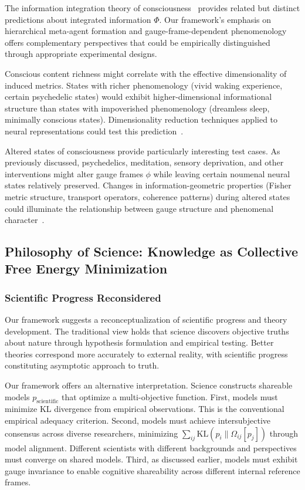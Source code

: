\documentclass[11pt]{article}
\begin{document}
The information integration theory of consciousness~\cite{Tononi2004,Tononi2016} provides related but distinct predictions about integrated information $\Phi$. Our framework's emphasis on hierarchical meta-agent formation and gauge-frame-dependent phenomenology offers complementary perspectives that could be empirically distinguished through appropriate experimental designs.

Conscious content richness might correlate with the effective dimensionality of induced metrics. States with richer phenomenology (vivid waking experience, certain psychedelic states) would exhibit higher-dimensional informational structure than states with impoverished phenomenology (dreamless sleep, minimally conscious states). Dimensionality reduction techniques applied to neural representations could test this prediction~\cite{Gao2017,Shine2019}.

Altered states of consciousness provide particularly interesting test cases. As previously discussed, psychedelics, meditation, sensory deprivation, and other interventions might alter gauge frames $\phi$ while leaving certain noumenal neural states relatively preserved. Changes in information-geometric properties (Fisher metric structure, transport operators, coherence patterns) during altered states could illuminate the relationship between gauge structure and phenomenal character~\cite{Carhart-Harris2014,Milliere2018}.

\subsection{Philosophy of Science: Knowledge as Collective Free Energy Minimization}

\subsubsection{Scientific Progress Reconsidered}

Our framework suggests a reconceptualization of scientific progress and theory development. The traditional view holds that science discovers objective truths about nature through hypothesis formulation and empirical testing. Better theories correspond more accurately to external reality, with scientific progress constituting asymptotic approach to truth.

Our framework offers an alternative interpretation. Science constructs shareable models $p_{\text{scientific}}$ that optimize a multi-objective function. First, models must minimize KL divergence from empirical observations.  This is the conventional empirical adequacy criterion. Second, models must achieve intersubjective consensus across diverse researchers, minimizing $\sum_{ij} \mathrm{KL}(p_i \| \Omega_{ij}[p_j])$ through model alignment. Different scientists with different backgrounds and perspectives must converge on shared models. Third, as discussed earlier, models must exhibit gauge invariance to enable cognitive shareability across different internal reference frames.
\end{document}
